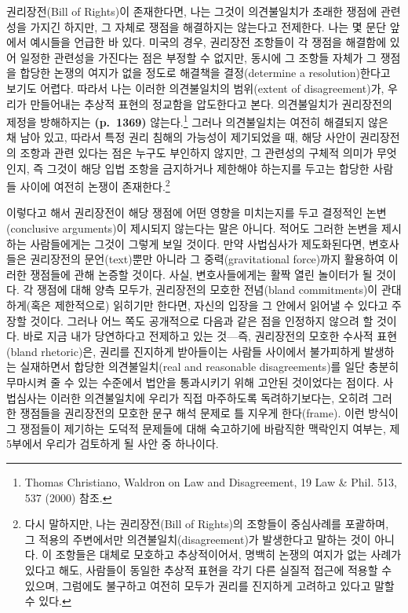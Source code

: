 \documentclass[a4paper,12pt,oneside]{article}  %
\begin{document}
권리장전(Bill of Rights)이 존재한다면, 나는 그것이 의견불일치가 초래한
쟁점에 관련성을 가지긴 하지만, 그 자체로 쟁점을 해결하지는 않는다고
전제한다. 나는 몇 문단 앞에서 예시들을 언급한 바 있다. 미국의 경우,
권리장전 조항들이 각 쟁점을 해결함에 있어 일정한 관련성을 가진다는 점은
부정할 수 없지만, 동시에 그 조항들 자체가 그 쟁점을 합당한 논쟁의 여지가
없을 정도로 해결책을 결정(determine a resolution)한다고 보기도 어렵다.
따라서 나는 이러한 의견불일치의 범위(extent of disagreement)가, 우리가
만들어내는 추상적 표현의 정교함을 압도한다고 본다. 의견불일치가
권리장전의 제정을 방해하지는 \textbf{(p.~1369)} 않는다.\footnote{Thomas
  Christiano, Waldron on Law and Disagreement, 19 Law \& Phil. 513, 537
  (2000) 참조.} 그러나 의견불일치는 여전히 해결되지 않은 채 남아 있고,
따라서 특정 권리 침해의 가능성이 제기되었을 때, 해당 사안이 권리장전의
조항과 관련 있다는 점은 누구도 부인하지 않지만, 그 관련성의 구체적
의미가 무엇인지, 즉 그것이 해당 입법 조항을 금지하거나 제한해야 하는지를
두고는 합당한 사람들 사이에 여전히 논쟁이 존재한다.\footnote{다시
  말하지만, 나는 권리장전(Bill of Rights)의 조항들이 중심사례를
  포괄하며, 그 적용의 주변에서만 의견불일치(disagreement)가 발생한다고
  말하는 것이 아니다. 이 조항들은 대체로 모호하고 추상적이어서, 명백히
  논쟁의 여지가 없는 사례가 있다고 해도, 사람들이 동일한 추상적 표현을
  각기 다른 실질적 접근에 적용할 수 있으며, 그럼에도 불구하고 여전히
  모두가 권리를 진지하게 고려하고 있다고 말할 수 있다.}

이렇다고 해서 권리장전이 해당 쟁점에 어떤 영향을 미치는지를 두고
결정적인 논변(conclusive arguments)이 제시되지 않는다는 말은 아니다.
적어도 그러한 논변을 제시하는 사람들에게는 그것이 그렇게 보일 것이다.
만약 사법심사가 제도화된다면, 변호사들은 권리장전의 문언(text)뿐만
아니라 그 중력(gravitational force)까지 활용하여 이러한 쟁점들에 관해
논증할 것이다. 사실, 변호사들에게는 활짝 열린 놀이터가 될 것이다. 각
쟁점에 대해 양측 모두가, 권리장전의 모호한 전념(bland commitments)이
관대하게(혹은 제한적으로) 읽히기만 한다면, 자신의 입장을 그 안에서
읽어낼 수 있다고 주장할 것이다. 그러나 어느 쪽도 공개적으로 다음과 같은
점을 인정하지 않으려 할 것이다. 바로 지금 내가 당연하다고 전제하고 있는
것---즉, 권리장전의 모호한 수사적 표현(bland rhetoric)은, 권리를
진지하게 받아들이는 사람들 사이에서 불가피하게 발생하는 실재하면서
합당한 의견불일치(real and reasonable disagreements)를 일단 충분히
무마시켜 줄 수 있는 수준에서 법안을 통과시키기 위해 고안된 것이었다는
점이다. 사법심사는 이러한 의견불일치에 우리가 직접 마주하도록
독려하기보다는, 오히려 그러한 쟁점들을 권리장전의 모호한 문구 해석
문제로 틀 지우게 한다(frame). 이런 방식이 그 쟁점들이 제기하는 도덕적
문제들에 대해 숙고하기에 바람직한 맥락인지 여부는, 제5부에서 우리가
검토하게 될 사안 중 하나이다.
\end{document}
